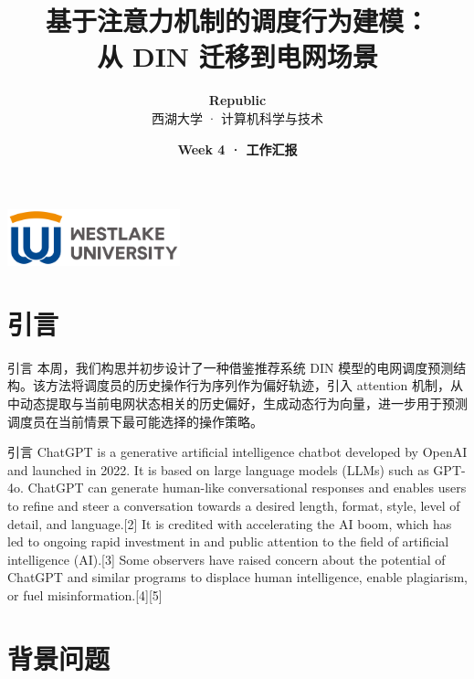 \documentclass[11pt]{beamer}
\title{\textbf{基于注意力机制的调度行为建模：\\从 DIN 迁移到电网场景}}
\author[Republic]{\textbf{Republic}\\{\small 西湖大学 · 计算机科学与技术}}
\institute[]{\textit{Westlake University} \\ \vspace{0.2em} Department of Computer Science and Technology}
\date{\textbf{Week 4 · 工作汇报}}
\begin{document}

\begin{frame}
\titlepage
\begin{center}
  \includegraphics[width=5cm]{./pic/logo3.png}
\end{center}
\end{frame}


\section{引言}

\begin{frame}{引言}
 本周，我们构思并初步设计了一种借鉴推荐系统 DIN 模型的电网调度预测结构。该方法将调度员的历史操作行为序列作为偏好轨迹，引入 attention 机制，从中动态提取与当前电网状态相关的历史偏好，生成动态行为向量，进一步用于预测调度员在当前情景下最可能选择的操作策略。
\end{frame}


\begin{frame}{引言}
  ChatGPT is a generative artificial intelligence chatbot developed by OpenAI and launched in 2022. It is based on large language models (LLMs) such as GPT-4o. ChatGPT can generate human-like conversational responses and enables users to refine and steer a conversation towards a desired length, format, style, level of detail, and language.[2] It is credited with accelerating the AI boom, which has led to ongoing rapid investment in and public attention to the field of artificial intelligence (AI).[3] Some observers have raised concern about the potential of ChatGPT and similar programs to displace human intelligence, enable plagiarism, or fuel misinformation.[4][5]

 \end{frame}



\section{背景问题}
\end{document}
